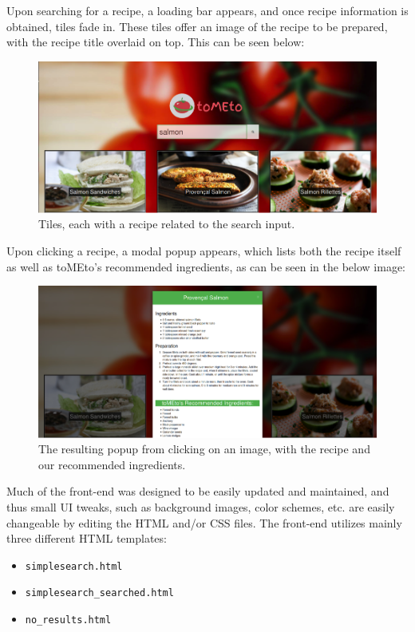 \documentclass{acm_proc_article-sp}
\begin{document}
Upon searching for a recipe, a loading bar appears, and once recipe information is obtained, tiles fade in. These tiles offer an image of the recipe to be prepared, with the recipe title overlaid on top. This can be seen below:
\begin{figure}[H]
\includegraphics[scale=0.5]{p2.png}
\caption{Tiles, each with a recipe related to the search input.}
\end{figure}
Upon clicking a recipe, a modal popup appears, which lists both the recipe itself as well as toMEto's recommended ingredients, as can be seen in the below image:
\begin{figure}[H]
\includegraphics[scale=0.5]{p3.png}
\caption{The resulting popup from clicking on an image, with the recipe and our recommended ingredients.}
\end{figure}
Much of the front-end was designed to be easily updated and maintained, and thus small UI tweaks, such as background images, color schemes, etc. are easily changeable by editing the HTML and/or CSS files. The front-end utilizes mainly three different HTML templates:
\begin{itemize}
\item \texttt{simplesearch.html}
\item \texttt{simplesearch\_searched.html} 
\item \texttt{no\_results.html}
\end{itemize}
\end{document}
